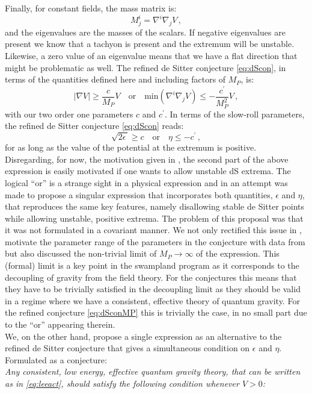 \documentclass[a4paper,12pt,twoside,openright]{report}
\newcommand{\be}{\begin{equation}}
\newcommand{\ee}{\end{equation}}
\begin{document}
Finally, for constant fields, the mass matrix is:
\be
M^i_j= \nabla^i \nabla_j V\,,
\ee
and the eigenvalues are the masses of the scalars. If negative eigenvalues are present we know that a tachyon is present and the extremum will be unstable. Likewise, a zero value of an eigenvalue means that we have a flat direction that might be problematic as well. The refined de Sitter conjecture \eqref{eq:dScon}, in terms of the quantities defined here and including factors of $M_P$, is:
\be 
|\nabla V| \geq \frac{c}{M_P} V \quad \text{or} \quad \text{min}(\nabla^i \nabla_j V) \leq - \frac{c^ \prime}{M_P^ 2} V\,,
\label{eq:dSconMP}
\ee
with our two order one parameters $c$ and $c^ \prime$. In terms of the slow-roll parameters, the refined de Sitter conjecture \eqref{eq:dScon} reads:
\be 
\sqrt{2 \epsilon \,} \geq c \quad \text{or} \quad \eta \leq - c^\prime\,,
\ee
for as long as the value of the potential at the extremum is positive. Disregarding, for now, the motivation given in \cite{Ooguri:2018wrx}, the second part of the above expression is easily motivated if one wants to allow unstable dS extrema. The logical ``or'' is a strange sight in a physical expression and in \cite{Andriot:2018wzk} an attempt was made to propose a singular expression that incorporates both quantities, $\epsilon$ and $\eta$, that reproduces the same key features, namely disallowing stable de Sitter points while allowing unstable, positive extrema. The problem of this proposal was that it was not formulated in a covariant manner. We not only rectified this issue in \cite{Andriot:2018mav}, motivate the parameter range of the parameters in the conjecture with data from \cite{Roupec:2018mbn} but also discussed the non-trivial limit of $M_P \to \infty$ of the expression. This (formal) limit is a key point in the swampland program as it corresponds to the decoupling of gravity from the field theory. For the conjectures this means that they have to be trivially satisfied in the decoupling limit as they should be valid in a regime where we have a consistent, effective theory of quantum gravity. For the refined conjecture \eqref{eq:dSconMP} this is trivially the case, in no small part due to the ``or'' appearing therein.\\
We, on the other hand, propose a single expression as an alternative to the refined de Sitter conjecture that gives a simultaneous condition on $\epsilon$ and $\eta$. Formulated as a conjecture:\\
\emph{Any consistent, low energy, effective quantum gravity theory, that can be written as in \eqref{eq:leeact}, should satisfy the following condition whenever $V>0$:}
\end{document}
